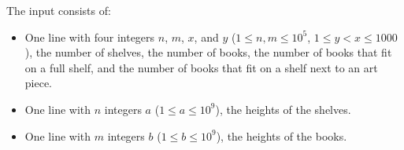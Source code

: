 
The input consists of:
\begin{itemize}
	\item One line with four integers  $n$, $m$, $x$, and $y$ ($1 \leq n, m \leq
	10^5$, $1 \leq y < x \leq 1000$), the number of shelves, the number of books,
	the number of books that fit on a full shelf,
	and the number of books that fit on a shelf next to an art piece.
	\item One line with $n$ integers $a$ ($1 \leq a \leq 10^9$), the heights of the shelves.
	\item One line with $m$ integers $b$ ($1 \leq b \leq 10^9$), the heights of the books.
\end{itemize}
